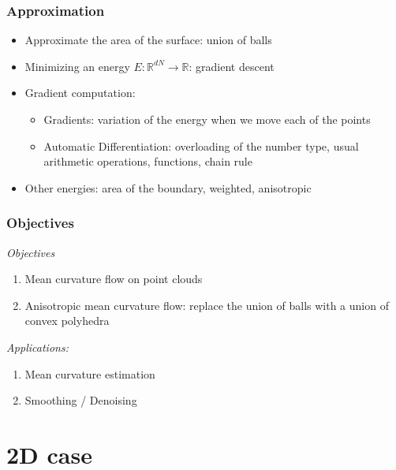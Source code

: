 \documentclass{beamer}
\newcommand{\R}{\mathbb{R}}
\begin{document}
\begin{frame}
    \frametitle{Approximation}

    \begin{itemize}
        \item Approximate the area of the surface: union of balls
        \item Minimizing an energy $ E : \R^{dN} \to \R $: gradient descent
        \item Gradient computation:
            \begin{itemize}
                \item Gradients: variation of the energy when we move each of
                    the points
                \item Automatic Differentiation: overloading of the number type,
                    usual arithmetic operations, functions, chain rule
            \end{itemize}
        \item Other energies: area of the boundary, weighted, anisotropic
    \end{itemize}
\end{frame}

\begin{frame}
    \frametitle{Objectives}

    \emph{Objectives}
    \begin{enumerate}
        \item Mean curvature flow on point clouds
        \item Anisotropic mean curvature flow: replace the union of balls with a
            union of convex polyhedra
    \end{enumerate}

    \emph{Applications:}
    \begin{enumerate}
        \item Mean curvature estimation
        \item Smoothing / Denoising
    \end{enumerate}
\end{frame}

\section{2D case}
\end{document}
